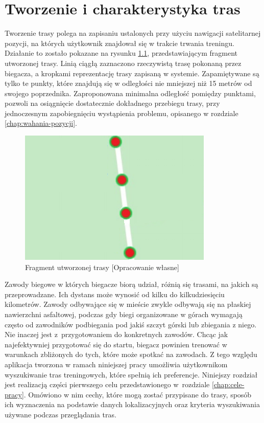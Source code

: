 \chapter{Tworzenie i charakterystyka tras}\label{chap:charakterystyka-tras}
Tworzenie trasy polega na zapisaniu ustalonych przy użyciu nawigacji satelitarnej pozycji, na których użytkownik znajdował się w trakcie trwania treningu. Działanie to zostało pokazane na rysunku \ref{image:mapka_fragment_trasy}, przedstawiającym fragment utworzonej trasy. Linią ciągłą zaznaczono rzeczywistą trasę pokonaną przez biegacza, a kropkami reprezentację trasy zapisaną w systemie. Zapamiętywane są tylko te punkty, które znajdują się w odległości nie mniejszej niż 15 metrów od swojego poprzednika. Zaproponowana minimalna odległość pomiędzy punktami, pozwoli na osiągnięcie dostatecznie dokładnego przebiegu trasy, przy jednoczesnym zapobiegnięciu wystąpienia problemu, opisanego w rozdziale \ref{chap:wahania-pozycji}.

\begin{figure}[h]
\begin{center}
\includegraphics{img/mapka_fragment_trasy.png}
\caption{Fragment utworzonej trasy [Opracowanie własne]}\label{image:mapka_fragment_trasy}
\end{center}
\end{figure}

Zawody biegowe w których biegacze biorą udział, różnią się trasami, na jakich są przeprowadzane. Ich dystans może wynosić od kilku do kilkudziesięciu kilometrów. Zawody odbywające się w mieście zwykle odbywają się na płaskiej nawierzchni asfaltowej, podczas gdy biegi organizowane w górach wymagają często od zawodników podbiegania pod jakiś szczyt górski lub zbiegania z niego. Nie inaczej jest z~przygotowaniem do konkretnych zawodów. Chcąc jak najefektywniej przygotować się do startu, biegacz powinien trenować w warunkach zbliżonych do tych, które może spotkać na zawodach. Z tego względu aplikacja tworzona w ramach niniejszej pracy umożliwia użytkownikom wyszukiwanie tras treningowych, które spełnią ich preferencje. Niniejszy rozdział jest realizacją części pierwszego celu przedstawionego w~rozdziale \ref{chap:cele-pracy}. Omówiono w nim cechy, które mogą zostać przypisane do trasy, sposób ich wyznaczenia na podstawie danych lokalizacyjnych oraz kryteria wyszukiwania używane podczas przeglądania tras. 
